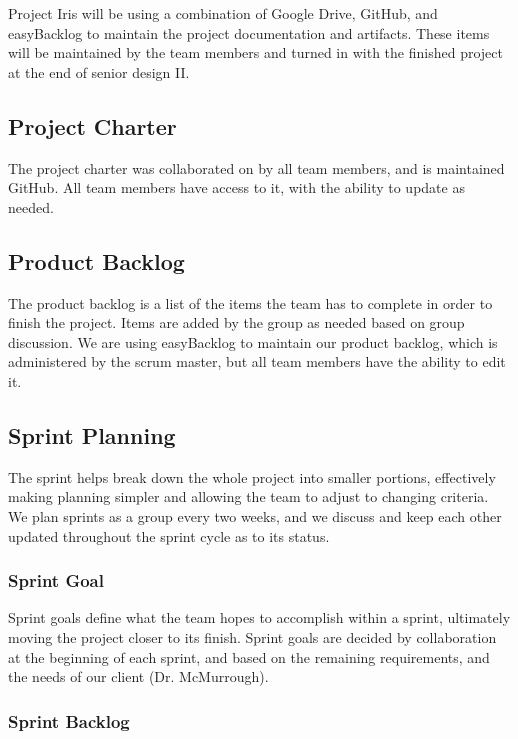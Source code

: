 
Project Iris will be using a combination of Google Drive, GitHub, and easyBacklog to maintain the project documentation and artifacts. These items will be maintained by the team members and turned in with the finished project at the end of senior design II.

\subsection{Project Charter}

The project charter was collaborated on by all team members, and is maintained GitHub. All team members have access to it, with the ability to update as needed.

\subsection{Product Backlog}

The product backlog is a list of the items the team has to complete in order to finish the project. Items are added by the group as needed based on group discussion. We are using easyBacklog to maintain our product backlog, which is administered by the scrum master, but all team members have the ability to edit it.

\subsection{Sprint Planning}

The sprint helps break down the whole project into smaller portions, effectively making planning simpler and allowing the team to adjust to changing criteria. We plan sprints as a group every two weeks, and we discuss and keep each other updated throughout the sprint cycle as to its status.

\subsubsection{Sprint Goal}

Sprint goals define what the team hopes to accomplish within a sprint, ultimately moving the project closer to its finish. Sprint goals are decided by collaboration at the beginning of each sprint, and based on the remaining requirements, and the needs of our client (Dr. McMurrough).

\subsubsection{Sprint Backlog}

